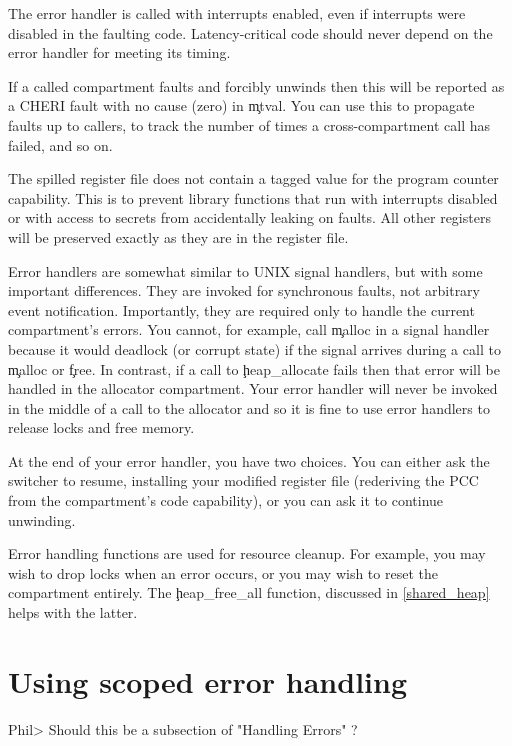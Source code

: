 
\begin{warning}
The error handler is called with interrupts enabled, even if interrupts were disabled in the faulting code.
Latency-critical code should never depend on the error handler for meeting its timing.
\end{warning}

If a called compartment faults and forcibly unwinds then this will be reported as a CHERI fault with no cause (zero) in \c{mtval}.
You can use this to propagate faults up to callers, to track the number of times a cross-compartment call has failed, and so on.

The spilled register file does not contain a tagged value for the program counter capability.
This is to prevent library functions that run with interrupts disabled or with access to secrets from accidentally leaking on faults.
All other registers will be preserved exactly as they are in the register file.

\begin{note}
Error handlers are somewhat similar to UNIX signal handlers, but with some important differences.
They are invoked for synchronous faults, not arbitrary event notification.
Importantly, they are required only to handle the current compartment's errors.
You cannot, for example, call \c{malloc} in a signal handler because it would deadlock (or corrupt state) if the signal arrives during a call to \c{malloc} or \c{free}.
In contrast, if a call to \c{heap_allocate} fails then that error will be handled in the allocator compartment.
Your error handler will never be invoked in the middle of a call to the allocator and so it is fine to use error handlers to release locks and free memory.
\end{note}

At the end of your error handler, you have two choices.
You can either ask the switcher to resume, installing your modified register file (rederiving the PCC from the compartment's code capability), or you can ask it to continue unwinding.

Error handling functions are used for resource cleanup.
For example, you may wish to drop locks when an error occurs, or you may wish to reset the compartment entirely.
The \c{heap_free_all} function, discussed in \ref{shared_heap} helps with the latter.

\section{Using scoped error handling}
Phil> Should this be a subsection of "Handling Errors" ? 

